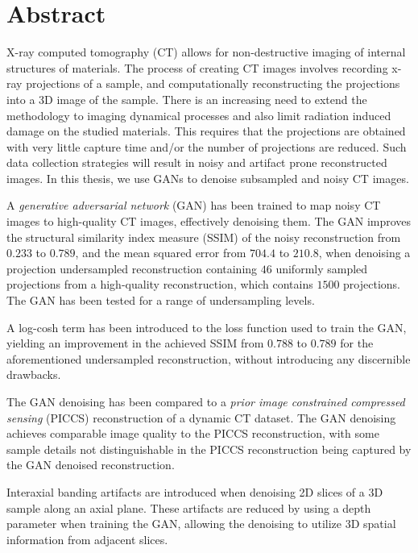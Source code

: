 \chapter*{Abstract}
X-ray computed tomography (CT) allows for non-destructive imaging of internal structures of materials. The process of creating CT images involves recording x-ray projections of a sample, and computationally reconstructing the projections into a 3D image of the sample. There is an increasing need to extend the methodology to imaging dynamical processes and also limit radiation induced damage on the studied materials. This requires that the projections are obtained with very little capture time and/or the number of projections are reduced. Such data collection strategies will result in noisy and artifact prone reconstructed images. In this thesis, we use GANs to denoise subsampled and noisy CT images. 

A \textit{generative adversarial network} (GAN) has been trained to map noisy CT images to high-quality CT images, effectively denoising them. The GAN improves the structural similarity index measure (SSIM) of the noisy reconstruction from $0.233$ to $0.789$, and the mean squared error from $704.4$ to $210.8$, when denoising a projection undersampled reconstruction containing $46$ uniformly sampled projections from a high-quality reconstruction, which contains $1500$ projections. The GAN has been tested for a range of undersampling levels. 

A log-cosh term has been introduced to the loss function used to train the GAN, yielding an improvement in the achieved SSIM from $0.788$ to $0.789$ for the aforementioned undersampled reconstruction, without introducing any discernible drawbacks. 

The GAN denoising has been compared to a \textit{prior image constrained compressed sensing} (PICCS) reconstruction of a dynamic CT dataset. The GAN denoising achieves comparable image quality to the PICCS reconstruction, with some sample details not distinguishable in the PICCS reconstruction being captured by the GAN denoised reconstruction. 

Interaxial banding artifacts are introduced when denoising 2D slices of a 3D sample along an axial plane. These artifacts are reduced by using a depth parameter when training the GAN, allowing the denoising to utilize 3D spatial information from adjacent slices. 